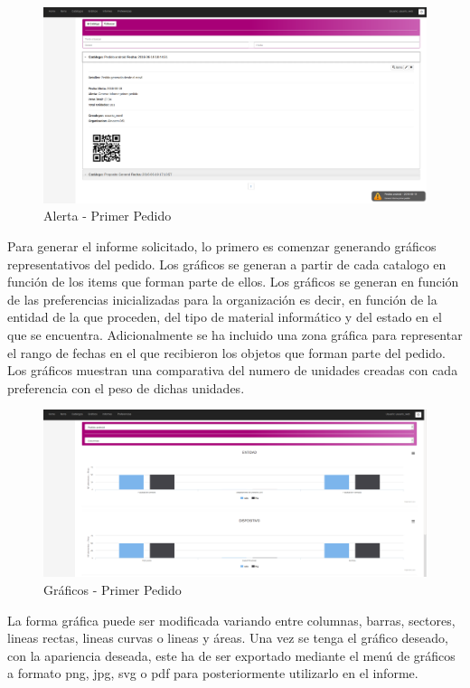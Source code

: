 \documentclass[a4paper,11pt]{book}
\begin{document}
\begin{figure}[H] 
\centering 
\includegraphics[scale=0.25]{imagenes/pruebas/alerta.png}
\caption{ Alerta - Primer Pedido\cite{propio}}
\end{figure}

Para generar el informe solicitado, lo primero es comenzar generando gráficos representativos del pedido. Los gráficos se generan a partir de cada catalogo en función de los items que forman parte de ellos. Los gráficos se generan en función de las preferencias inicializadas para la organización es decir, en función de la entidad de la que proceden, del tipo de material informático y del estado en el que se encuentra. Adicionalmente se ha incluido una zona gráfica para representar el rango de fechas en el que recibieron los objetos que forman parte del pedido. Los gráficos muestran una comparativa del numero de unidades creadas con cada preferencia con el peso de dichas unidades. 

\begin{figure}[H] 
\centering 
\includegraphics[scale=0.25]{imagenes/pruebas/g.png}
\caption{ Gráficos - Primer Pedido\cite{propio}}
\end{figure}

La forma gráfica puede ser modificada variando entre columnas, barras, sectores, lineas rectas, lineas curvas o lineas y áreas. Una vez se tenga el gráfico deseado, con la apariencia deseada,  este ha de ser exportado mediante el menú de gráficos a formato png, jpg, svg o pdf para posteriormente utilizarlo en el informe. 
\end{document}
